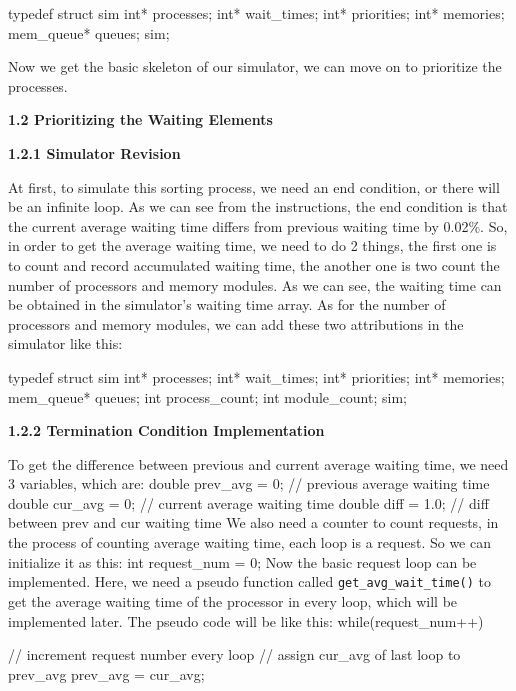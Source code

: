 \documentclass{article}%
\newenvironment{code}%
   {\snugshade\verbatim}%
   {\endverbatim\endsnugshade}
\begin{document}
\begin{Large}
\begin{code}
    typedef struct sim {
        int* processes;
        int* wait_times;
        int* priorities;
        int* memories;
        mem_queue* queues;
    } sim;
\end{code}

Now we get the basic skeleton of our simulator, we can move on to prioritize the processes.

\begin{LARGE}
\begin{flushleft}
\textbf{1.2 Prioritizing the Waiting Elements}
\end{flushleft}
\end{LARGE}
\begin{flushleft}
\textbf{1.2.1 Simulator Revision}
\end{flushleft}
At first, to simulate this sorting process, we need an end condition, or there will be an infinite loop. As we can see from the instructions, the end condition is that the current average waiting time differs from previous waiting time by 0.02\%. So, in order to get the average waiting time, we need to do 2 things, the first one is to count and record accumulated waiting time, the another one is two count the number of processors and memory modules. As we can see, the waiting time can be obtained in the simulator's waiting time array. As for the number of processors and memory modules, we can add these two attributions in the simulator like this:

\begin{code}
    typedef struct sim {
        int* processes;
        int* wait_times;
        int* priorities;
        int* memories;
        mem_queue* queues;
        int process_count;
        int module_count;
    } sim;
\end{code}
\newpage
\begin{flushleft}
\textbf{1.2.2 Termination Condition Implementation}
\end{flushleft}

To get the difference between previous and current average waiting time, we need 3 variables, which are:
\begin{code}
    double prev_avg = 0; // previous average waiting time
    double cur_avg = 0; // current average waiting time
    double diff = 1.0; // diff between prev and cur waiting time
\end{code}
We also need a counter to count requests, in the process of counting average waiting time, each loop is a request. So we can initialize it as this:
\begin{code}
    int request_num = 0;
\end{code}
Now the basic request loop can be implemented. Here, we need a pseudo function called \texttt{get\_avg\_wait\_time()} to get the average waiting time of the processor in every loop, which will be implemented later. The pseudo code will be like this:
\begin{code}
    while(request_num++) { // increment request number every loop
        // assign cur_avg of last loop to prev_avg
        prev_avg = cur_avg; 
        
}
\end{code}
\end{Large}
\end{document}
